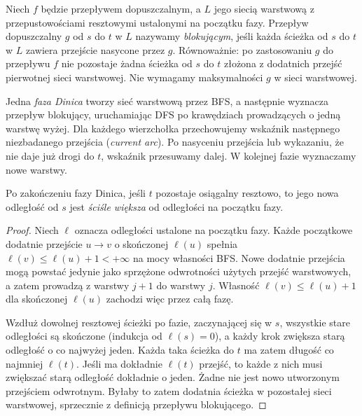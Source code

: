 \begin{definicja}
\label{def:tg-flow-blocking}
Niech $f$ będzie przepływem dopuszczalnym,
a $L$ jego siecią warstwową z przepustowościami
resztowymi ustalonymi na początku fazy.
Przepływ dopuszczalny $g$ od $s$ do $t$ w $L$
nazywamy \emph{blokującym}, jeśli każda ścieżka
od $s$ do $t$ w $L$ zawiera przejście nasycone
przez $g$. Równoważnie: po zastosowaniu $g$
do przepływu $f$ nie pozostaje żadna ścieżka
od $s$ do $t$ złożona z dodatnich przejść
pierwotnej sieci warstwowej. Nie wymagamy
maksymalności $g$ w sieci warstwowej.
\end{definicja}

Jedna \emph{faza Dinica} tworzy sieć warstwową
przez BFS, a następnie wyznacza przepływ
blokujący, uruchamiając DFS po krawędziach
prowadzących o jedną warstwę wyżej.
Dla każdego wierzchołka przechowujemy
wskaźnik następnego niezbadanego przejścia
(\emph{current arc}). Po nasyceniu przejścia
lub wykazaniu, że nie daje już drogi do $t$,
wskaźnik przesuwamy dalej.
W kolejnej fazie wyznaczamy nowe warstwy.

\begin{lemat}
\label{lem:tg-flow-dinic-distance}
Po zakończeniu fazy Dinica, jeśli
$t$ pozostaje osiągalny resztowo,
to jego nowa odległość od $s$
jest \emph{ściśle większa}
od odległości na początku fazy.
\end{lemat}
\begin{proof}
Niech $\ell$ oznacza odległości ustalone na początku
fazy. Każde początkowe dodatnie przejście $u\to v$
o skończonej $\ell(u)$ spełnia
$\ell(v)\leq\ell(u)+1<+\infty$ na mocy własności BFS.
Nowe dodatnie przejścia mogą powstać jedynie jako
sprzężone odwrotności użytych przejść warstwowych,
a zatem prowadzą z warstwy $j+1$ do warstwy $j$.
Własność $\ell(v)\leq\ell(u)+1$ dla skończonej
$\ell(u)$ zachodzi więc przez całą fazę.

Wzdłuż dowolnej resztowej ścieżki po fazie,
zaczynającej się w $s$, wszystkie stare odległości
są skończone (indukcja od $\ell(s)=0$),
a każdy krok zwiększa starą odległość o co najwyżej
jeden. Każda taka ścieżka do $t$ ma zatem długość
co najmniej $\ell(t)$. Jeśli ma dokładnie $\ell(t)$
przejść, to każde z nich musi zwiększać starą
odległość dokładnie o jeden. Żadne nie jest nowo
utworzonym przejściem odwrotnym.
Byłaby to zatem dodatnia
ścieżka w pozostałej sieci warstwowej,
sprzecznie z definicją
przepływu blokującego.
\end{proof}

